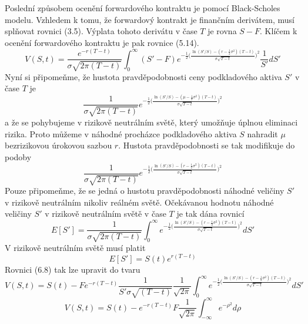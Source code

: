 \documentclass[a4paper]{book}
\begin{document}
Poslední způsobem ocenění forwardového kontraktu je pomocí Black-Scholes modelu. Vzhledem k tomu, že forwardový kontrakt je finančním derivátem, musí splňovat rovnici (3.5). Výplata tohoto derivátu v čase $T$ je rovna $S-F$. Klíčem k ocenění forwardového kontraktu je pak rovnice (5.14).
\begin{equation}
V(S,t) = \frac{e^{-r(T - t)}}{\sigma \sqrt{2 \pi (T - t)}} \int^{\infty}_0 (S' - F)e^{-\frac{1}{2} \big( \frac{\ln (S'/S) - (r - \frac{1}{2}\sigma^2)(T - t)}{\sigma \sqrt{T - t}} \big)^2} \frac{1}{S'}dS'
\end{equation}
Nyní si připomeňme, že hustota pravděpodobnosti ceny podkladového aktiva $S'$ v čase $T$ je
\begin{equation*}
\frac{1}{\sigma \sqrt{2 \pi (T - t)}} e^{-\frac{1}{2} \big( \frac{\ln (S'/S) - (\mu - \frac{1}{2}\sigma^2)(T - t)}{\sigma \sqrt{T - t}} \big)^2}
\end{equation*}
a že se pohybujeme v rizikově neutrálním světě, který umožňuje úplnou eliminaci rizika. Proto můžeme v náhodné procházce podkladového aktiva $S$ nahradit $\mu$ bezrizikovou úrokovou sazbou $r$. Hustota pravděpodobnosti se tak modifikuje do podoby
\begin{equation*}
\frac{1}{\sigma \sqrt{2 \pi (T - t)}} e^{-\frac{1}{2} \big( \frac{\ln (S'/S) - (r - \frac{1}{2}\sigma^2)(T - t)}{\sigma \sqrt{T - t}} \big)^2}
\end{equation*}
Pouze připomeňme, že se jedná o hustotu pravděpodobnosti náhodné veličiny $S'$ v rizikově neutrálním nikoliv reálném světě. Očekávanou hodnotu náhodné veličiny $S'$ v rizikově neutrálním světě v čase $T$ je tak dána rovnicí
\begin{equation*}
E[S'] = \frac{1}{\sigma \sqrt{2 \pi (T - t)}}\int^{\infty}_0 e^{-\frac{1}{2} \big( \frac{\ln (S'/S) - (r - \frac{1}{2}\sigma^2)(T - t)}{\sigma \sqrt{T - t}} \big)^2}dS'
\end{equation*}
V rizikově neutrálním světě musí platit
\begin{equation*}
E[S'] = S(t)e^{r(T-t)}
\end{equation*}
Rovnici (6.8) tak lze upravit do tvaru
\begin{equation*}
V(S,t) = S(t) - F e^{-r(T - t)}\frac{1}{S ' \sigma \sqrt{(T - t)}}\frac{1}{\sqrt{2 \pi}} \int^{\infty}_0 e^{-\frac{1}{2} \big( \frac{\ln (S'/S) - (r - \frac{1}{2}\sigma^2)(T - t)}{\sigma \sqrt{T - t}} \big)^2} dS'
\end{equation*}
\begin{equation*}
V(S,t) = S(t) - e^{-r(T - t)} F \frac{1}{\sqrt{2 \pi}} \int^{\infty}_{-\infty}e^{-\rho^2}d\rho
\end{equation*}
\end{document}
